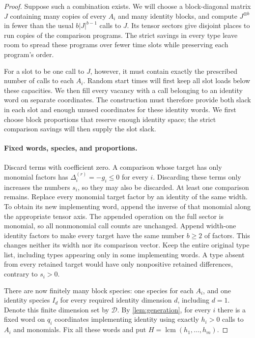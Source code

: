 \begin{proof}
Suppose such a combination exists. We will choose a block-diagonal matrix
$J$ containing many copies of every $A_i$ and many identity blocks, and
compute $J^{\otimes b}$ in fewer than the usual $b|J|^{b-1}$ calls to
$J$. Its tensor sectors give disjoint places to run copies of the
comparison programs. The strict savings in every type leave room to
spread these programs over fewer time slots while preserving each
program's order.

For a slot to be one call to $J$, however, it must contain exactly the
prescribed number of calls to each $A_i$. Random start times will first
keep all slot loads below these capacities. We then fill every vacancy
with a call belonging to an identity word on separate coordinates.
The construction must therefore provide both slack in each slot and
enough unused coordinates for these identity words. We first choose
block proportions that reserve enough identity space; the strict
comparison savings will then supply the slot slack.

\paragraph{Fixed words, species, and proportions.}
Discard terms with coefficient zero.  A comparison whose target has only
monomial factors has \(\Delta^{(r)}_i=-g_i\leq0\) for every \(i\).
Discarding these terms only increases the numbers \(s_i\), so they may
also be discarded.  At least one comparison remains.  Replace every
monomial target factor by an identity of the same width.  To obtain its
new implementing word, append the inverse of that monomial along the
appropriate tensor axis.  The appended operation on the full sector is
monomial, so all nonmonomial call counts are unchanged.  Append width-one
identity factors to make every target have the same number \(b\geq2\)
of factors.  This changes neither its width nor its comparison vector.
Keep the entire original type list, including types appearing only in
some implementing words.  A type absent from every retained target would
have only nonpositive retained differences, contrary to \(s_i>0\).

There are now finitely many block species: one species for each \(A_i\),
and one identity species \(I_d\) for every required identity dimension
\(d\), including \(d=1\).  Denote this finite dimension set by
\(\mathcal D\).  By \cref{lem:generation}, for every \(i\) there is a
fixed word on \(q_i\) coordinates implementing identity using exactly
\(h_i>0\) calls to \(A_i\) and monomials.  Fix all these words and put
\(H=\operatorname{lcm}(h_1,\ldots,h_m)\).


\end{proof}
